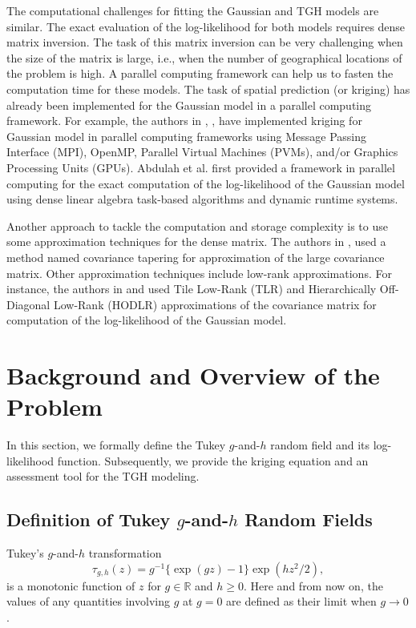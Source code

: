 \documentclass[conference]{IEEEtran}
\begin{document}
The computational challenges for fitting the Gaussian and TGH models are similar. The exact evaluation of the log-likelihood for both models requires dense matrix inversion. 
The task of this matrix inversion can be very challenging when 
the size of the matrix is large, i.e., when the number of geographical locations of the problem is high. A parallel computing framework can help us to fasten the computation time for these 
models. The task of spatial prediction (or kriging) has already been implemented for the Gaussian model in a parallel computing 
framework. For example, the authors in \cite{2017.T.L.R.S.G.G.L.G.T.M.L.R.D.S.JournalofComputationalInterdisciplinarySciences},  \cite{2013.T.C.ComputersandGeosciences}, \cite{2012.P.T.M.S.G.M.A.H.ComputersandGeosciences} have implemented kriging for Gaussian model in parallel 
computing frameworks using Message Passing Interface (MPI), OpenMP, Parallel Virtual Machines (PVMs), and/or Graphics Processing 
Units (GPUs). Abdulah et al. \cite{abdulah2018exageostat} first provided a framework in parallel computing for the exact computation 
of the log-likelihood of the Gaussian model using dense linear algebra task-based algorithms and dynamic runtime systems.

Another approach to tackle the computation and storage 
complexity is to use some approximation techniques for 
the dense matrix. The authors in \cite{furrer2006covariance}, \cite{sang2012full} used a method named covariance tapering for approximation of the large covariance matrix. Other 
approximation techniques include low-rank approximations. For instance, the authors in \cite{abdulah2018parallel} and \cite{geoga2020scalable} used Tile Low-Rank (TLR) and 
Hierarchically Off-Diagonal Low-Rank (HODLR) 
approximations of the covariance matrix for computation 
of the log-likelihood of the Gaussian model.




\section{Background and Overview of the Problem}
In this section, we formally define the Tukey $g$-and-$h$ random field and its log-likelihood function. Subsequently, we provide the kriging equation and an assessment tool for the TGH modeling.
\subsection{Definition of Tukey $g$-and-$h$ Random Fields}
Tukey's $g$-and-$h$ transformation
\begin{equation}\label{eq:TGH_transformation}
\tau_{g,h}(z) = g^{-1} \{ \exp(gz)-1 \} \exp(h z^2/2),
\end{equation}
is a monotonic function of $z$ for $g \in \mathbb{R}$ and $h \geq 0$. Here and from now on, the values of any quantities involving $g$ at $g = 0$ are defined as their limit when $g \rightarrow 0$.
\end{document}
